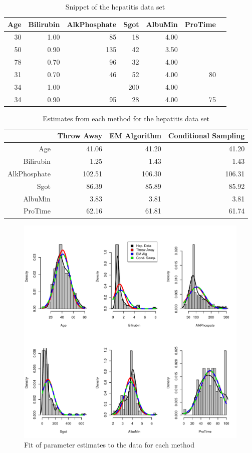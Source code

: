 \documentclass{svproc}
\begin{document}
\begin{table}[!h]
\centering
\begin{tabular}{rrrrrrr}
  \hline
  Age & Bilirubin & AlkPhosphate & Sgot & AlbuMin & ProTime \\ 
  \hline
    30 & 1.00 &  85 &  18 & 4.00 &  \\ 
    50 & 0.90 & 135 &  42 & 3.50 &  \\ 
    78 & 0.70 &  96 &  32 & 4.00 &  \\ 
    31 & 0.70 &  46 &  52 & 4.00 &  80 \\ 
    34 & 1.00 &  & 200 & 4.00 &  \\ 
    34 & 0.90 &  95 &  28 & 4.00 &  75 \\ 
   \hline
\end{tabular}
\caption{Snippet of the hepatitis data set}
\label{tab3}
\end{table}

\begin{table}[h]
\centering
\begin{tabular}{rrrr}
  \hline
 & Throw Away & EM Algorithm & Conditional Sampling \\ 
  \hline
Age & 41.06 & 41.20 & 41.20 \\ 
  Bilirubin & 1.25 & 1.43 & 1.43 \\ 
  AlkPhosphate & 102.51 & 106.30 & 106.31 \\ 
  Sgot & 86.39 & 85.89 & 85.92 \\ 
  AlbuMin & 3.83 & 3.81 & 3.81 \\ 
  ProTime & 62.16 & 61.81 & 61.74 \\ 
   \hline
\end{tabular}

\caption{Estimates from each method for the hepatitis data set}
\label{tab4}
\end{table}


\begin{figure}[!h]
\begin{center}
\includegraphics[width=0.65\linewidth]{goodnessoffit}
\end{center}
\caption{Fit of parameter estimates to the data for each method}
\label{fig1}
\end{figure}
\end{document}
